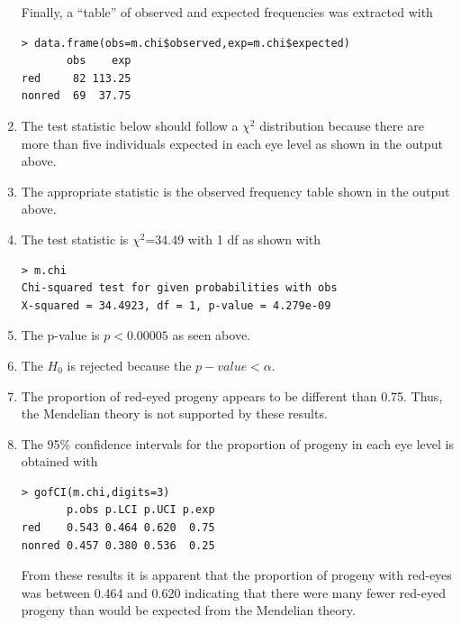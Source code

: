 \documentclass[10pt,openany]{book}\usepackage[]{graphicx}\usepackage[]{color}
\makeatletter
\newenvironment{kframe}{%
 \def\at@end@of@kframe{}%
 \ifinner\ifhmode%
  \def\at@end@of@kframe{\end{minipage}}%
  \begin{minipage}{\columnwidth}%
 \fi\fi%
 \def\FrameCommand##1{\hskip\@totalleftmargin \hskip-\fboxsep
 \colorbox{shadecolor}{##1}\hskip-\fboxsep
     \hskip-\linewidth \hskip-\@totalleftmargin \hskip\columnwidth}%
 \MakeFramed {\advance\hsize-\width
   \@totalleftmargin\z@ \linewidth\hsize
   \@setminipage}}%
 {\par\unskip\endMakeFramed%
 \at@end@of@kframe}
\newenvironment{knitrout}{}{} %
\makeatother
\begin{document}
\begin{enumerate}
Finally, a ``table'' of observed and expected frequencies was extracted with
\begin{knitrout}
\color{fgcolor}\begin{kframe}
\begin{verbatim}
> data.frame(obs=m.chi$observed,exp=m.chi$expected)
       obs    exp
red     82 113.25
nonred  69  37.75
\end{verbatim}
\end{kframe}
\end{knitrout}
  \item The test statistic below should follow a $\chi^{2}$ distribution because there are more than five individuals expected in each eye level as shown in the output above.
  \item The appropriate statistic is the observed frequency table shown in the output above.
  \item The test statistic is $\chi^2$=34.49 with 1 df as shown with
\begin{knitrout}
\color{fgcolor}\begin{kframe}
\begin{verbatim}
> m.chi
Chi-squared test for given probabilities with obs 
X-squared = 34.4923, df = 1, p-value = 4.279e-09
\end{verbatim}
\end{kframe}
\end{knitrout}
  \item The p-value is $p<0.00005$ as seen above.
  \item The $H_{0}$ is rejected because the $p-value<\alpha$.
  \item The proportion of red-eyed progeny appears to be different than 0.75.  Thus, the Mendelian theory is not supported by these results.
  \item The 95\% confidence intervals for the proportion of progeny in each eye level is obtained with
\begin{knitrout}
\color{fgcolor}\begin{kframe}
\begin{verbatim}
> gofCI(m.chi,digits=3)
       p.obs p.LCI p.UCI p.exp
red    0.543 0.464 0.620  0.75
nonred 0.457 0.380 0.536  0.25
\end{verbatim}
\end{kframe}
\end{knitrout}
From these results it is apparent that the proportion of progeny with red-eyes was between 0.464 and 0.620 indicating that there were many fewer red-eyed progeny than would be expected from the Mendelian theory.
\end{enumerate}
\end{document}

